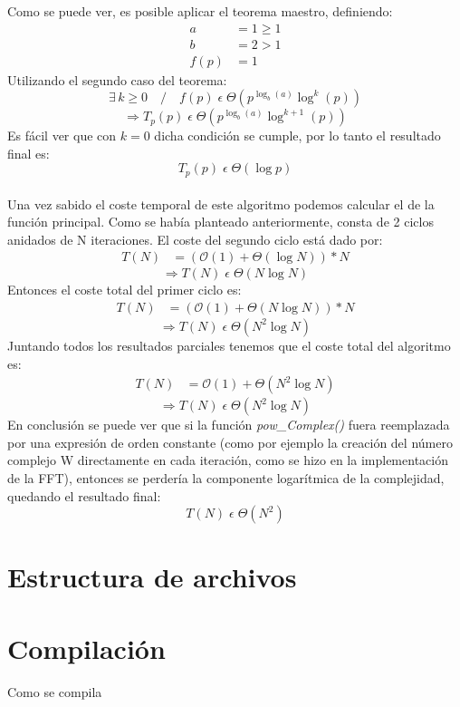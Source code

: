 \documentclass{article}
\begin{document}
    Como se puede ver, es posible aplicar el teorema maestro, definiendo:
    \begin{align*}
      a &= 1 \geq 1 \\
      b &= 2 > 1\\
   f(p) &= 1 
    \end{align*}
      Utilizando el segundo caso del teorema:
    $$ \exists\,k \geq 0 \quad / \quad f(p) \;\epsilon\; \Theta (p^{\log_b (a)} \log^k (p)) $$
    $$ \Rightarrow T_p(p)\;\epsilon\;\Theta (p^{\log_b (a)} \log^{k+1} (p)) $$
      Es fácil ver que con $k=0$ dicha condición se cumple, por lo tanto
    el resultado final es:
    $$ T_p(p)\;\epsilon\;\Theta (\log p) $$\\
  Una vez sabido el coste temporal de este algoritmo podemos calcular el de la función
  principal. Como se había planteado anteriormente, consta de 2 ciclos anidados de N iteraciones.
  El coste del segundo ciclo está dado por:
  \begin{align*}
      T(N) &= (\mathcal{O}(1) + {\Theta}(\log N)) * N
  \end{align*}
    $$ \Rightarrow T(N)\;\epsilon\;\Theta (N\log N) $$
  Entonces el coste total del primer ciclo es:
  \begin{align*}
      T(N) &= (\mathcal{O}(1) + {\Theta}(N\log N)) * N
  \end{align*}
  $$ \Rightarrow T(N)\;\epsilon\;\Theta (N^2\log N) $$
  Juntando todos los resultados parciales tenemos que el coste total del algoritmo es:
  \begin{align*}
      T(N) &= \mathcal{O}(1) + {\Theta}(N^2\log N)
  \end{align*}
  $$ \Rightarrow \boxed{ T(N)\;\epsilon\;\Theta (N^2\log N) } $$
    En conclusión se puede ver que si la función \textit{pow\_Complex()} fuera reemplazada por
  una expresión de orden constante (como por ejemplo la creación del número complejo W
  directamente en cada iteración, como se hizo en la implementación de la FFT), entonces se 
  perdería la componente logarítmica de la complejidad, quedando el resultado final:
  $$ \boxed{ T(N)\;\epsilon\;\Theta (N^2) } $$



\section{Estructura de archivos}

\section{Compilación}
Como se compila
\end{document}
